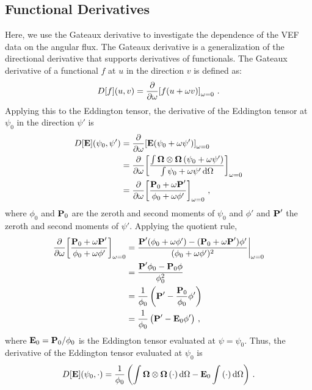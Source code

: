 \documentclass[../doc.tex]{subfiles}
\begin{document}
\subsection{Functional Derivatives} \label{vef_sec:gateaux}
Here, we use the Gateaux derivative to investigate the dependence of the VEF data on the angular flux. The Gateaux derivative is a generalization of the directional derivative that supports derivatives of functionals. The Gateaux derivative of a functional $f$ at $u$ in the direction $v$ is defined as: 
	\begin{equation}
		D[f](u,v) = \pderiv{}{\omega}\bracket{f(u + \omega v)}_{\omega = 0} \,. 
	\end{equation}
Applying this to the Eddington tensor, the derivative of the Eddington tensor at $\psi_0$ in the direction $\psi'$ is 
	\begin{equation}
	\begin{aligned}
		D[\E](\psi_0,\psi') &= \pderiv{}{\omega} \bracket{\E(\psi_0 + \omega\psi')}_{\omega=0} \\
		&= \pderiv{}{\omega}\bracket{\frac{\int \Omegahat\otimes\Omegahat\paren{\psi_0 + \omega\psi'}}{\int \psi_0 + \omega \psi' \ud \Omega}}_{\omega=0} \\
		&= \pderiv{}{\omega}\bracket{\frac{\P_0 + \omega\P'}{\phi_0 + \omega\phi'}}_{\omega=0} \,,
	\end{aligned}
	\end{equation}
where $\phi_0$ and $\P_0$ are the zeroth and second moments of $\psi_0$ and $\phi'$ and $\P'$ the zeroth and second moments of $\psi'$. Applying the quotient rule, 
	\begin{equation}
	\begin{aligned}
		\pderiv{}{\omega}\bracket{\frac{\P_0 + \omega\P'}{\phi_0 + \omega\phi'}}_{\omega=0} &= \frac{\P'(\phi_0 + \omega \phi') - (\P_0 + \omega\P')\phi'}{(\phi_0 + \omega\phi')^2} \biggr\rvert_{\omega=0} \\
		&= \frac{\P' \phi_0 - \P_0 \phi}{\phi_0^2} \\
		&= \frac{1}{\phi_0}\paren{\P' - \frac{\P_0}{\phi_0} \phi'} \\
		&= \frac{1}{\phi_0}\paren{\P' - \E_0 \phi'} \,, 
	\end{aligned}
	\end{equation}
where $\E_0 = \P_0/\phi_0$ is the Eddington tensor evaluated at $\psi = \psi_0$. 
Thus, the derivative of the Eddington tensor evaluated at $\psi_0$ is 
	\begin{equation} \label{vef:Edd_deriv}
		D[\E](\psi_0,\cdot) = \frac{1}{\phi_0} \paren{\int \Omegahat\otimes\Omegahat\paren{\cdot}\ud\Omega - \E_0\int \paren{\cdot}\ud \Omega} \,. 
	\end{equation}
\end{document}
